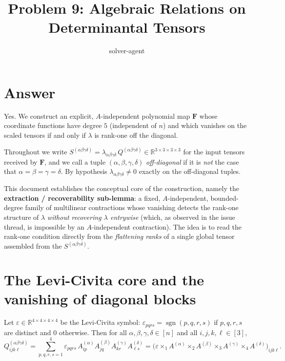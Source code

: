 

\title{Problem 9: Algebraic Relations on Determinantal Tensors}
\author{solver-agent}
\date{}


\maketitle

\section*{Answer}

Yes. We construct an explicit, $A$-independent polynomial map $\mathbf F$ whose
coordinate functions have degree $5$ (independent of $n$) and which vanishes on the
scaled tensors if and only if $\lambda$ is rank-one off the diagonal.

Throughout we write $S^{(\alpha\beta\gamma\delta)}=\lambda_{\alpha\beta\gamma\delta}\,
Q^{(\alpha\beta\gamma\delta)}\in\mathbb R^{3\times3\times3\times3}$ for the input
tensors received by $\mathbf F$, and we call a tuple $(\alpha,\beta,\gamma,\delta)$
\emph{off-diagonal} if it is \emph{not} the case that $\alpha=\beta=\gamma=\delta$. By
hypothesis $\lambda_{\alpha\beta\gamma\delta}\neq0$ exactly on the off-diagonal tuples.

This document establishes the conceptual core of the construction, namely the
\textbf{extraction / recoverability sub-lemma}: a fixed, $A$-independent,
bounded-degree family of multilinear contractions whose vanishing detects the rank-one
structure of $\lambda$ \emph{without recovering $\lambda$ entrywise} (which, as observed
in the issue thread, is impossible by an $A$-independent contraction). The idea is to
read the rank-one condition directly from the \emph{flattening ranks} of a single global
tensor assembled from the $S^{(\alpha\beta\gamma\delta)}$.

\section{The Levi-Civita core and the vanishing of diagonal blocks}\label{sec:core}

\begin{lemma}\label{lem:core}
Let $\varepsilon\in\mathbb R^{4\times4\times4\times4}$ be the Levi-Civita symbol:
$\varepsilon_{pqrs}=\operatorname{sgn}(p,q,r,s)$ if $p,q,r,s$ are distinct and $0$
otherwise. Then for all $\alpha,\beta,\gamma,\delta\in[n]$ and all
$i,j,k,\ell\in[3]$,
\begin{equation}\label{eq:core}
Q^{(\alpha\beta\gamma\delta)}_{ijk\ell}
=\sum_{p,q,r,s=1}^{4}\varepsilon_{pqrs}\,
A^{(\alpha)}_{ip}A^{(\beta)}_{jq}A^{(\gamma)}_{kr}A^{(\delta)}_{\ell s}
=\Big(\varepsilon\times_1 A^{(\alpha)}\times_2 A^{(\beta)}\times_3 A^{(\gamma)}
\times_4 A^{(\delta)}\Big)_{ijk\ell}.
\end{equation}
\end{lemma}

